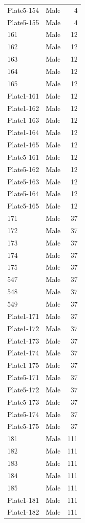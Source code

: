 \begin{longtable}{l l r}
Plate5-154 & Male & 4 \\
Plate5-155 & Male & 4 \\
161 & Male & 12 \\
162 & Male & 12 \\
163 & Male & 12 \\
164 & Male & 12 \\
165 & Male & 12 \\
Plate1-161 & Male & 12 \\
Plate1-162 & Male & 12 \\
Plate1-163 & Male & 12 \\
Plate1-164 & Male & 12 \\
Plate1-165 & Male & 12 \\
Plate5-161 & Male & 12 \\
Plate5-162 & Male & 12 \\
Plate5-163 & Male & 12 \\
Plate5-164 & Male & 12 \\
Plate5-165 & Male & 12 \\
171 & Male & 37 \\
172 & Male & 37 \\
173 & Male & 37 \\
174 & Male & 37 \\
175 & Male & 37 \\
547 & Male & 37 \\
548 & Male & 37 \\
549 & Male & 37 \\
Plate1-171 & Male & 37 \\
Plate1-172 & Male & 37 \\
Plate1-173 & Male & 37 \\
Plate1-174 & Male & 37 \\
Plate1-175 & Male & 37 \\
Plate5-171 & Male & 37 \\
Plate5-172 & Male & 37 \\
Plate5-173 & Male & 37 \\
Plate5-174 & Male & 37 \\
Plate5-175 & Male & 37 \\
181 & Male & 111 \\
182 & Male & 111 \\
183 & Male & 111 \\
184 & Male & 111 \\
185 & Male & 111 \\
Plate1-181 & Male & 111 \\
Plate1-182 & Male & 111 \\

\end{longtable}

